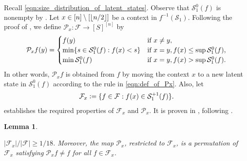 \documentclass[11pt]{article}
\newcommand{\eqdef}{\vcentcolon=}
\newcommand{\mcF}{\mathcal{F}}
\newcommand{\mcP}{\mathcal{P}}
\newcommand{\mcS}{\mathcal{S}}
\DeclarePairedDelimiter\floor{\lfloor}{\rfloor}
\newtheorem{lemma}[theorem]{Lemma}
\theoremstyle{definition}
\theoremstyle{definition}
\begin{document}
Recall \eqref{eqn:size_distribution_of_latent_states}.
Observe that $\mcS_1^0(f)$ is nonempty by .
Let $x \in [n]\setminus [\floor{n/2}]$ be a context in $f^{-1}(\mcS_1)$.
Following the proof of \cite[Lemma 5.1]{zhang2016minimax}, we define $\mcP_x:\mcF\rightarrow [S]^{[n]}$ by
\begin{equation}
	\mcP_x f(y)
	=
	\begin{cases}
		f(y)
		 &
		\textnormal{if } x \neq y,                          \\
		\min
		\{ s\in \mcS_1^0(f): f(x)<s\}
		 &
		\textnormal{if } x = y, f(x) \leq \sup \mcS_1^0(f), \\
		\min
		\mcS_1^0(f)
		 &
		\textnormal{if } x = y, f(x) > \sup \mcS_1^0(f).    \\
	\end{cases}
	\label{eqn:def_of_Px}
\end{equation}
In other words, $\mcP_x f$ is obtained from $f$ by moving the context $x$ to a new latent state in $\mcS_1^0(f)$ according to the rule in \eqref{eqn:def_of_Px}.
Also, let
\begin{equation}
	\label{eqn:def_of_mcFx}
	\mcF_x
	\eqdef
	\{f\in\mcF: f(x)\in \mcS_1^{+1}(f)\}
	.
\end{equation}
 establishes the required properties of $\mcF_x$ and $\mcP_x$.
It is proven in , following \cite{zhang2016minimax}.

\begin{lemma}
	\label{lem:Px_is_a_permutation}

	$|\mcF_x|/|\mcF|\geq 1/18$.
	Moreover, the map $\mcP_x$, restricted to $\mcF_x$, is a permutation of $\mcF_x$ satisfying $\mcP_xf\neq f$ for all $f\in\mcF_x$.
\end{lemma}
\end{document}
